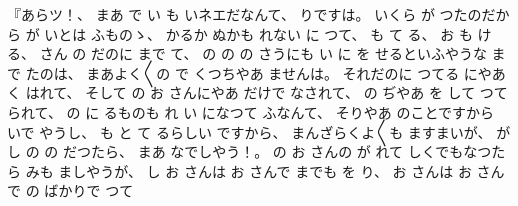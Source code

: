 %
『あらツ！、
%
まあ
で%
い
も
いネエだなんて、
%
りですは。
%
いくら
が
つたのだから
が
いとは
ふものゝ、
%
かるか
ぬかも
れない
に
つて、
%
も
て
る、
%
お
も
ける、
%
さん
の
だのに
まで
て、
%
の
の
の
さうにも
い
に%
を
せるといふやうな
まで
たのは、
%
まあよく〳〵の
で
くつちやあ
ませんは。
%
それだのに
つてる
にやあ
く
はれて、
%
そして
の
お
さんにやあ
だけで
なされて、
%
の
ぢやあ
を
して
つて
られて、
%
の
に
るものも
れ
い
になつて
ふなんて、
%
そりやあ
のことですから
いで
やうし、
%
も
と
て
るらしい
ですから、
%
まんざらくよ〳〵も
ますまいが、
%
が
し
の
の
だつたら、
%
まあ
なでしやう！。
%
の
お
さんの
が
れて
しくでもなつたら
みも
ましやうが、
%
し
お
さんは
お
さんで
までも
を
り、
%
お
さんは
お
さんで
の
ばかりで
つて

